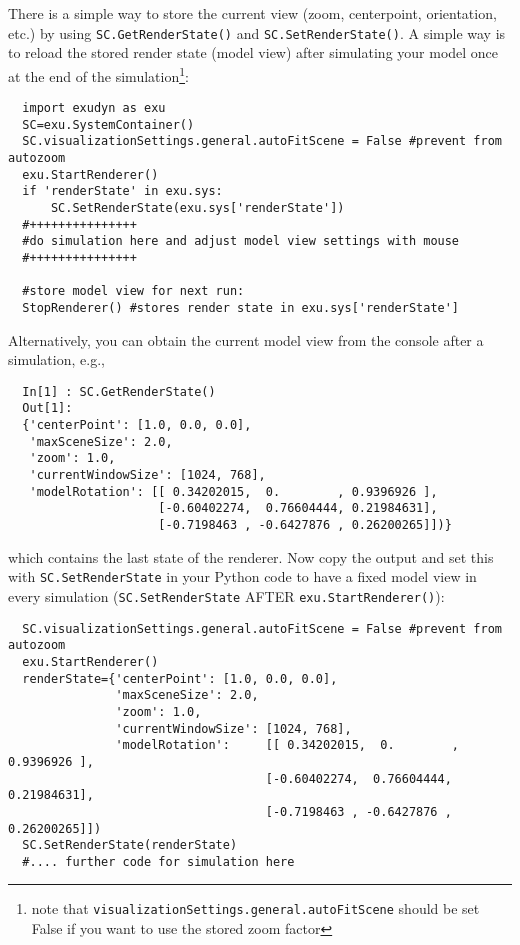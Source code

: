 \label{sec:storing:modelview}
There is a simple way to store the current view (zoom, centerpoint, orientation, etc.) by using \texttt{SC.GetRenderState()} and \texttt{SC.SetRenderState()}.
%
A simple way is to reload the stored render state (model view) after simulating your model once at the end of the simulation\footnote{
note that \texttt{visualizationSettings.general.autoFitScene} should be set False if you want to use the stored zoom factor}:
\pythonstyle\begin{lstlisting}
  import exudyn as exu
  SC=exu.SystemContainer()
  SC.visualizationSettings.general.autoFitScene = False #prevent from autozoom
  exu.StartRenderer()
  if 'renderState' in exu.sys:
      SC.SetRenderState(exu.sys['renderState']) 
  #+++++++++++++++
  #do simulation here and adjust model view settings with mouse
  #+++++++++++++++

  #store model view for next run:
  StopRenderer() #stores render state in exu.sys['renderState']
\end{lstlisting}
\horizontalRuler
%
Alternatively, you can obtain the current model view from the console after a simulation, e.g.,
\pythonstyle\begin{lstlisting}
  In[1] : SC.GetRenderState()
  Out[1]: 
  {'centerPoint': [1.0, 0.0, 0.0],
   'maxSceneSize': 2.0,
   'zoom': 1.0,
   'currentWindowSize': [1024, 768],
   'modelRotation': [[ 0.34202015,  0.        , 0.9396926 ],
                     [-0.60402274,  0.76604444, 0.21984631],
                     [-0.7198463 , -0.6427876 , 0.26200265]])}
\end{lstlisting}
%
which contains the last state of the renderer.
Now copy the output and set this with \texttt{SC.SetRenderState} in your Python code to have a fixed model view in every simulation (\texttt{SC.SetRenderState} AFTER \texttt{exu.StartRenderer()}):
\pythonstyle\begin{lstlisting}
  SC.visualizationSettings.general.autoFitScene = False #prevent from autozoom
  exu.StartRenderer()
  renderState={'centerPoint': [1.0, 0.0, 0.0],
               'maxSceneSize': 2.0,
               'zoom': 1.0,
               'currentWindowSize': [1024, 768],
               'modelRotation':     [[ 0.34202015,  0.        ,  0.9396926 ],
                                    [-0.60402274,  0.76604444,  0.21984631],
                                    [-0.7198463 , -0.6427876 ,  0.26200265]])
  SC.SetRenderState(renderState)
  #.... further code for simulation here
\end{lstlisting}
\horizontalRuler
%
%

